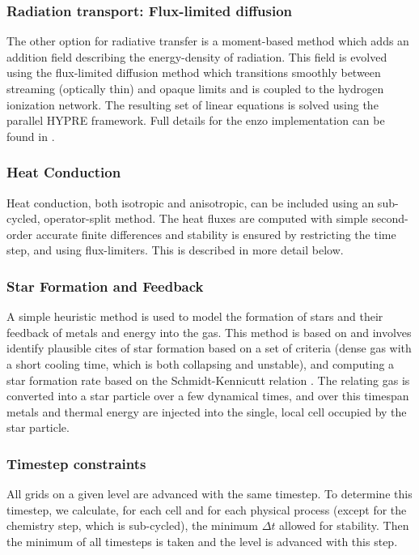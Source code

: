 \subsubsection{Radiation transport: Flux-limited diffusion}

The other option for radiative transfer is a moment-based method which adds an addition field describing the energy-density of radiation.  This field is evolved using the flux-limited diffusion method which transitions smoothly between streaming (optically thin) and opaque limits and is coupled to the hydrogen ionization network.  The resulting set of linear equations is solved using the parallel HYPRE framework.  Full details for the enzo implementation can be found in \citet{ReynoldsHayesPaschosNorman2009}.

\subsubsection{Heat Conduction}

Heat conduction, both isotropic and anisotropic, can be included using an sub-cycled, operator-split method.  The heat fluxes are computed with simple second-order accurate finite differences and stability is ensured by restricting the time step, and using flux-limiters.  This is described in more detail below.

\subsubsection{Star Formation and Feedback}

A simple heuristic method is used to model the formation of stars and their feedback of metals and energy into the gas.  This method is based on \citep{CO1992} and involves identify plausible cites of star formation based on a set of criteria (dense gas with a short cooling time, which is both collapsing and unstable), and computing a star formation rate based on the Schmidt-Kennicutt relation \citep{K89}.  The relating gas is converted into a star particle over a few dynamical times, and over this timespan metals and thermal energy are injected into the single, local cell occupied by the star particle.

\subsubsection{Timestep constraints}

All grids on a given level are advanced with the same timestep.  To determine this timestep, we calculate, for each cell and for each physical process (except for the chemistry step, which is sub-cycled), the minimum $\Delta t$ allowed for stability.  Then the minimum of all timesteps is taken and the level is advanced with this step.



